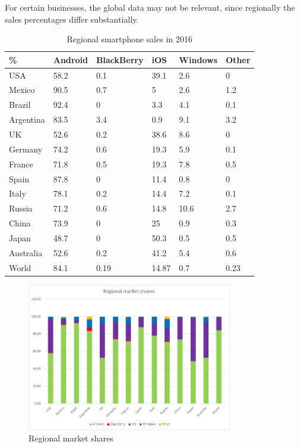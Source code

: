 \documentclass[english,master,public,dept460,male,cpdeclaration,oneside]{diploma}
\begin{document}
For certain businesses, the global data may not be relevant, since regionally the sales percentages differ substantially.

\begin{table}
	\centering
	\caption{Regional smartphone sales in 2016}
	\label{table:regionalSmartphoneSales}
	\begin{tabular}{l l l l l l}
		\toprule
		\% & Android & BlackBerry & iOS & Windows & Other \\
		\midrule
		USA & 58.2 & 0.1 & 39.1 & 2.6 & 0 \\
		Mexico & 90.5 & 0.7 & 5 & 2.6 & 1.2 \\
		Brazil & 92.4 & 0 & 3.3 & 4.1 & 0.1 \\
		Argentina & 83.5 & 3.4 & 0.9 & 9.1 & 3.2 \\
		UK & 52.6 & 0.2 & 38.6 & 8.6 & 0 \\
		Germany & 74.2 & 0.6 & 19.3 & 5.9 & 0.1 \\
		France & 71.8 & 0.5 & 19.3 & 7.8 & 0.5 \\
		Spain & 87.8 & 0 & 11.4 & 0.8 & 0 \\
		Italy & 78.1 & 0.2 & 14.4 & 7.2 & 0.1\\
		Russia & 71.2 & 0.6 & 14.8 & 10.6 & 2.7 \\
		China & 73.9 & 0 & 25 & 0.9 & 0.3 \\
		Japan & 48.7 & 0 & 50.3 & 0.5 & 0.5 \\
		Australia & 52.6 & 0.2 & 41.2 & 5.4 & 0.6 \\
		World & 84.1 & 0.19 & 14.87 & 0.7 & 0.23 \\
		\midrule
	\end{tabular}
\end{table}

\begin{figure}
	\centering\includegraphics[width=0.8\textwidth]{Figures/regionalMarketShares.png}
	\caption{Regional market shares \cite{kantarOSSales}}
	\label{figure:regionalMarketShares}
\end{figure}
\end{document}
